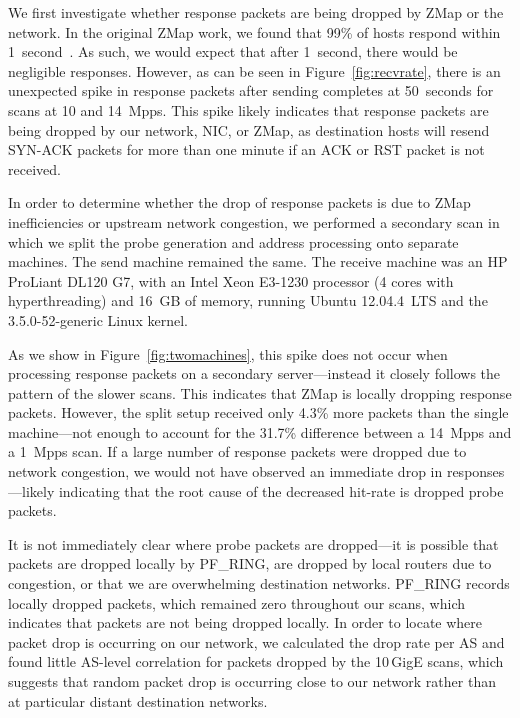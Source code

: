 We first investigate whether response packets are being dropped by ZMap or
the network. In the original ZMap work, we found that 99\% of hosts respond
within 1~second~\cite{zmap-2013}. As such, we would expect that after 1~second,
there would be negligible responses. However, as can be seen in
Figure~\ref{fig:recvrate}, there is an unexpected spike in response packets
after sending completes at 50~seconds for scans at 10 and 14~Mpps. This spike
likely indicates that response packets are being dropped by our network, NIC,
or ZMap, as destination hosts will resend SYN-ACK packets for more than one
minute if an ACK or RST packet is not received.

In order to determine whether the drop of response packets is due to ZMap
inefficiencies or upstream network congestion, we performed a secondary scan
in which we split the probe generation and address processing onto separate
machines. The send machine remained the same. The receive machine was an HP
ProLiant DL120 G7, with an Intel Xeon E3-1230 processor (4 cores with
hyperthreading) and 16~GB of memory, running Ubuntu 12.04.4~LTS and the
3.5.0-52-generic Linux kernel.

As we show in Figure~\ref{fig:twomachines}, this spike does not occur when
processing response packets on a secondary server---instead it closely
follows the pattern of the slower scans. This indicates that ZMap is locally
dropping response packets. However, the split setup received only 4.3\% more
packets than the single machine---not enough to account for the 31.7\%
difference between a 14~Mpps and a 1~Mpps scan. If a large number of response
packets were dropped due to network congestion, we would not have observed an
immediate drop in responses---likely indicating that the root cause of the
decreased hit-rate is dropped probe packets.

It is not immediately clear where probe packets are dropped---it is possible
that packets are dropped locally by PF\_RING, are dropped by local routers
due to congestion, or that we are overwhelming destination networks. PF\_RING
records locally dropped packets, which remained zero throughout our scans,
which indicates that packets are not being dropped locally. In order to
locate where packet drop is occurring on our network, we calculated the drop
rate per AS and found little AS-level correlation for packets dropped by the
10\,GigE scans, which suggests that random packet drop is occurring close to
our network rather than at particular distant destination networks.

